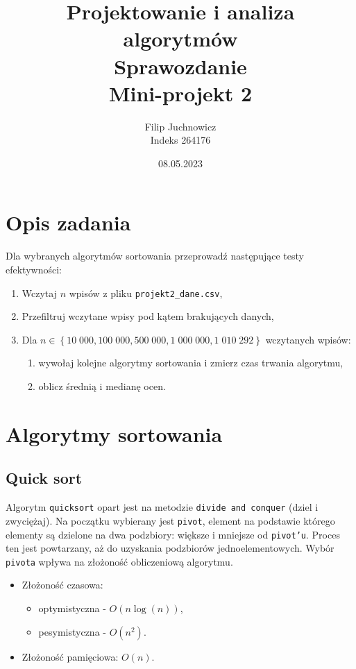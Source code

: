 \documentclass{article}
\title
{
    Projektowanie i analiza algorytmów \\
    Sprawozdanie \\
    Mini-projekt 2
}
\author{Filip Juchnowicz \vspace{10pt} \\ Indeks 264176}
\date{08.05.2023}
\begin{document}
    \maketitle
    \thispagestyle{empty}
    
    \newpage
    
    \tableofcontents
    \listoffigures
    \listoftables
    
    \newpage
    
    \section{Opis zadania}
    Dla wybranych algorytmów sortowania przeprowadź następujące testy efektywności:
    \begin{enumerate}
        \item Wczytaj $n$ wpisów z pliku \texttt{projekt2\_dane.csv},
        \item Przefiltruj wczytane wpisy pod kątem brakujących danych,
        \item Dla $n \in \left\lbrace 10\;000, 100\;000, 500\;000, 1\;000\;000, 1\;010\;292\right\rbrace$ wczytanych wpisów:
            \begin{enumerate}
                \item wywołaj kolejne algorytmy sortowania i zmierz czas trwania algorytmu,
                \item oblicz średnią i medianę ocen.
            \end{enumerate}
    \end{enumerate}
    
    \section{Algorytmy sortowania}
    \subsection{Quick sort}
    Algorytm \texttt{quicksort} opart jest na metodzie \texttt{divide and conquer} (dziel i zwyciężaj). Na początku wybierany jest \texttt{pivot}, element na podstawie którego elementy są dzielone na dwa podzbiory: większe i mniejsze od \texttt{pivot'u}. Proces ten jest powtarzany, aż do uzyskania podzbiorów jednoelementowych. Wybór \texttt{pivota} wpływa na złożoność obliczeniową algorytmu.
    \begin{itemize}
        \item Złożoność czasowa:
        \begin{itemize}
            \item optymistyczna - $O\left(n\log\left(n\right)\right)$,
            \item pesymistyczna - $O\left(n^2\right)$.
        \end{itemize}
        \item Złożoność pamięciowa: $O\left(n\right)$.
    \end{itemize}
\end{document}
